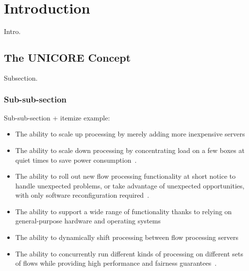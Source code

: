 \section{Introduction}
Intro.

\subsection {The UNICORE Concept}

Subsection.  

\subsubsection{Sub-sub-section}

Sub-sub-section + itemize example:

\begin{itemize}
  \item The ability to scale up processing by merely adding more inexpensive servers
  \item The ability to scale down processing by concentrating load on a few boxes
    at quiet times to save power consumption~\cite{latexcompanion}.
  \item The ability to roll out new flow processing functionality at short notice
    to handle unexpected problems, or take advantage of unexpected opportunities,
    with only software reconfiguration required~\cite{einstein}.
  \item The ability to support a wide range of functionality thanks to relying on
    general-purpose hardware and operating systems
  \item The ability to dynamically shift processing between flow processing servers
  \item The ability to concurrently run different kinds of processing on
    different sets of flows while providing high performance and fairness
    guarantees~\cite{knuthwebsite}.
\end{itemize}


